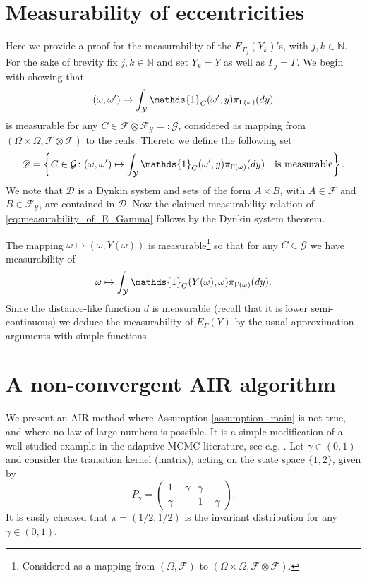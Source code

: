 \documentclass[12pt]{article}
\theoremstyle{definition}
\renewcommand{\d}{{\rm d}}
\newcommand{\N}{\mathbb{N}}
\newcommand{\cY}{\mathcal{Y}}
\begin{document}
\begin{appendix}
\section{Measurability of eccentricities}\label{sec:measurability_of_E_Gamma}	
Here we provide a proof for the measurability of the $E_{\Gamma_j}(Y_k)$'s, with $j,k \in \N$. 	
For the sake of brevity fix $j,k \in \N$ and set $Y_k =Y$ as well as $\Gamma_j = \Gamma$.
We begin with showing that  
\begin{equation}\label{eq:measurability_of_E_Gamma}
	(\omega,\omega') \mapsto \int_\cY \mathds{1}_{C} ( \omega',y) \pi_{\Gamma(\omega)} (\d y) 
\end{equation}
is measurable for any $C \in \mathcal{F} \otimes \mathcal{F}_\cY =: \mathcal{G}$, considered as mapping from $(\Omega\times \Omega, \mathcal{F}\otimes \mathcal{F})$ to the reals. 
Thereto we define the following set 
\[
\mathscr{D} = \left\{ C \in   \mathcal{G} \colon  (\omega,\omega') \mapsto \int_\cY \mathds{1}_{C} ( \omega',y) \pi_{\Gamma(\omega)} (\d y) \quad \text{is measurable} \right\}. 
\]
We note that $\mathscr{D}$ is a Dynkin system and sets of the form $A \times B$, with $A \in \mathcal{F}$ and $B \in \mathcal{F}_\cY$, are contained in $\mathscr{D}$. 
Now the claimed measurability relation of \eqref{eq:measurability_of_E_Gamma} follows by the Dynkin system theorem. 

The mapping $\omega \mapsto (\omega, Y(\omega))$ is measurable\footnote{Considered as a mapping from $(\Omega, \mathcal{F})$ to $(\Omega\times\Omega, \mathcal{F}\otimes \mathcal{F})$.} so that for any $C \in \mathcal{G}$ we have measurability of 
\[
\omega \mapsto \int_\cY \mathds{1}_{C} (Y(\omega), \omega) \pi_{\Gamma(\omega)} (\d y). 
\]
Since the distance-like function $d$ is measurable (recall that it is lower semi-continuous) we deduce the measurability of $E_\Gamma(Y)$ by the usual approximation arguments with simple functions. 


\section{A non-convergent AIR algorithm}\label{sec:appendix_counter_example} 
	We present an AIR method where Assumption \ref{assumption_main} is not true, and where no law of large numbers is possible. 
	It is a simple modification of a well-studied example in the adaptive MCMC literature, see e.g. \cite{andrieu2006ergodicity}.  
	Let $\gamma \in (0,1)$ and consider the transition kernel (matrix), acting on the state space $\{1,2\}$, given by
	\[
	P_\gamma = \begin{pmatrix}
		1- \gamma & \gamma\\
		\gamma & 1-\gamma
	\end{pmatrix}.
	\]
	It is easily checked that $\pi=(1/2, 1/2)$ is the invariant distribution for any $\gamma \in (0,1)$. 
	

\end{appendix}
\end{document}
